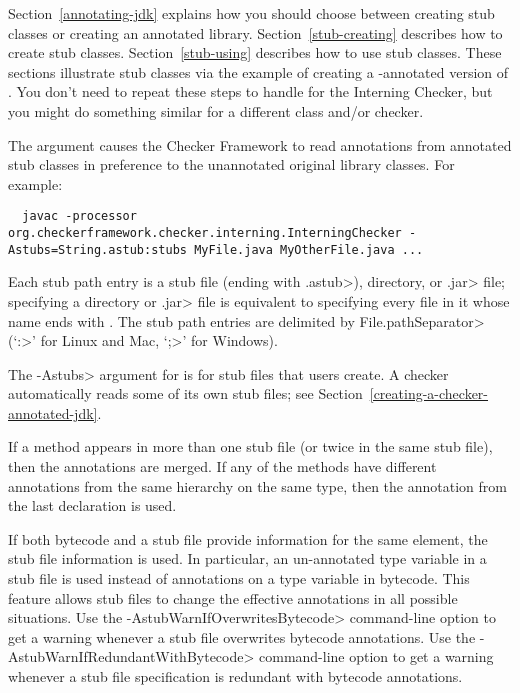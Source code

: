 Section~\ref{annotating-jdk} explains how you should choose between
creating stub classes or creating an annotated library.
Section~\ref{stub-creating} describes how to create stub classes.
Section~\ref{stub-using} describes how to use stub classes.
These sections illustrate stub classes via the example of creating a -annotated
version of .  You don't need to repeat these steps
to handle  for the Interning Checker,
but you might do something similar for a different class and/or checker.



The  argument causes the Checker Framework to read
annotations from annotated stub classes in preference to the unannotated
original library classes.  For example:

\begin{myxsmall}
\begin{Verbatim}
  javac -processor org.checkerframework.checker.interning.InterningChecker -Astubs=String.astub:stubs MyFile.java MyOtherFile.java ...
\end{Verbatim}
\end{myxsmall}

Each stub path entry is a stub file (ending with \<.astub>), directory, or
\<.jar> file; specifying a directory or \<.jar> file is
equivalent to specifying every file in it whose name ends with
.  The stub path entries are delimited by
\<File.pathSeparator> (`\<:>' for Linux and Mac, `\<;>' for Windows).

The \<-Astubs> argument for is for stub files that users create.
A checker automatically reads some of its own stub files; see
Section~\ref{creating-a-checker-annotated-jdk}.

If a method appears in more than one stub file (or twice in the same
stub file), then the annotations are merged. If any of the
methods have different annotations from the same hierarchy on the same type,
then the annotation from the last declaration is used.


If both bytecode and a stub file provide information for the same
element, the stub file information is used. In particular, an
un-annotated type variable in a stub file is used instead of
annotations on a type variable in bytecode.
This feature allows stub files to change the effective annotations in
all possible situations.
Use the \<-AstubWarnIfOverwritesBytecode> command-line option to get a
warning whenever a stub file overwrites bytecode annotations.
Use the \<-AstubWarnIfRedundantWithBytecode> command-line option to get
a warning whenever a stub file specification is redundant with
bytecode annotations.

